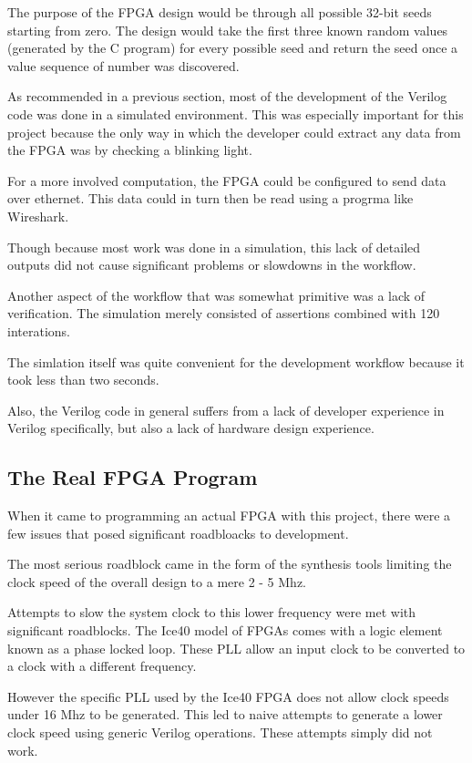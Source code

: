 \documentclass{article}
\begin{document}
    The purpose of the FPGA design would be through all possible
    32-bit seeds starting from zero.
    The design would take the first three known random values
    (generated by the C program) for every possible seed
    and return the seed once a value sequence of number was discovered.

    As recommended in a previous section, most of the development
    of the Verilog code was done in a simulated environment.
    This was especially important for this project because
    the only way in which the developer could extract any data
    from the FPGA was by checking a blinking light.

    For a more involved computation, the FPGA could be configured to
    send data over ethernet. This data could in turn then be read
    using a progrma like Wireshark.

    Though because most work was done in a simulation, this lack of detailed
    outputs did not cause significant problems or slowdowns in the workflow.

    Another aspect of the workflow that was somewhat primitive was a lack
    of verification. The simulation merely consisted of assertions combined
    with 120 interations.

    The simlation itself was quite convenient for the development workflow
    because it took less than two seconds.

    Also, the Verilog code in general suffers from a lack of developer
    experience in Verilog specifically, but also a lack of hardware design
    experience.

    \subsection{The Real FPGA Program}

    When it came to programming an actual FPGA with this project,
    there were a few issues that posed significant roadbloacks to development.

    The most serious roadblock came in the form of the synthesis tools
    limiting the clock speed of the overall design to a mere 2 - 5 Mhz.

    Attempts to slow the system clock to this lower frequency were
    met with significant roadblocks.
    The Ice40 model of FPGAs comes with a logic element known as
    a phase locked loop. These PLL allow an input clock to be converted
    to a clock with a different frequency.

    However the specific PLL used by the Ice40 FPGA does not allow clock speeds
    under 16 Mhz to be generated.
    This led to naive attempts to generate a lower clock speed using
    generic Verilog operations.
    These attempts simply did not work.
\end{document}

